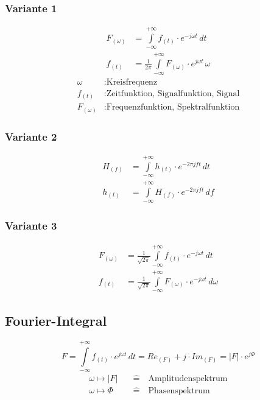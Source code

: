 \subsubsection{Variante 1}
\begin{align}
	F_{(\omega)} &= \int\limits_{-\infty}^{+\infty} f_{(t)}\cdot e^{-j\omega t}\,dt \\
	f_{(t)} &= \frac{1}{2\pi}\int\limits_{-\infty}^{+\infty} F_{(\omega)}\cdot e^{j\omega t}\,\omega 
\end{align}
\begin{align*}
	\omega & :\text{Kreisfrequenz} \\
	f_{(t)} & :\text{Zeitfunktion, Signalfunktion, Signal} \\
	F_{(\omega)} & :\text{Frequenzfunktion, Spektralfunktion}
\end{align*}

\subsubsection{Variante 2}
\begin{align}
	H_{(f)} &= \int\limits_{-\infty}^{+\infty} h_{(t)}\cdot e^{-2\pi jft}\,dt \\
	h_{(t)} &= \int\limits_{-\infty}^{+\infty} H_{(f)}\cdot e^{-2\pi jft}\,df
\end{align}

\subsubsection{Variante 3}
\begin{align}
	F_{(\omega)} &= \frac{1}{\sqrt{2\pi}}\int\limits_{-\infty}^{+\infty} f_{(t)}\cdot e^{-j\omega t}\,dt \\
	f_{(t)} &= \frac{1}{\sqrt{2\pi}}\int\limits_{-\infty}^{+\infty} F_{(\omega)}\cdot e^{-j\omega t}\,d\omega
\end{align}

\subsection{Fourier-Integral}
\begin{equation}
	F=\int\limits_{-\infty}^{+\infty} f_{(t)}\cdot e^{j\omega t}\,dt = Re_{(F)}+j\cdot Im_{(F)} = |F|\cdot e^{j\Phi}
\end{equation}
\begin{align*}
	\omega\mapsto |F| \quad & \hat{=}\quad\text{Amplitudenspektrum} \\
	\omega\mapsto \Phi \quad & \hat{=}\quad\text{Phasenspektrum}
\end{align*}


